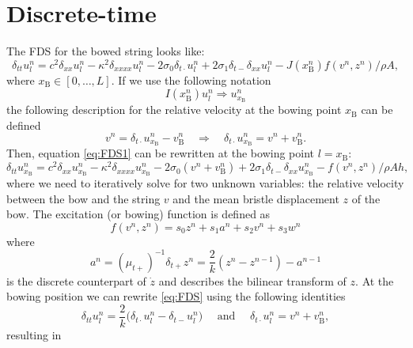 \documentclass{article}
\begin{document}
\section{Discrete-time}
The FDS for the bowed string looks like:
\begin{equation}\label{eq:FDS1}
    \delta_{tt} u_l^n =c^2 \delta_{xx} u_l^n -\kappa^2\delta_{xxxx} u_l^n - 2\sigma_0\delta_{t\cdot} u_l^n
    + 2\sigma_1\delta_{t-}\delta_{xx}u_l^n - J(x_\text{B}^n)f(v^n, z^n)/\rho A,
\end{equation}
where $x_\text{B} \in [0,\hdots, L]$. If we use the following notation
\begin{equation}
    I(x_\text{B}^n)u^n_l \Rightarrow u^n_{x_\text{B}}
\end{equation}
the following description for the relative velocity at the bowing point $x_\text{B}$ can be defined
\begin{equation}
    v^n = \delta_{t\cdot}u^n_{x_\text{B}} - v_\text{B}^n \quad \Rightarrow \quad \delta_{t\cdot}u^n_{x_\text{B}} = v^n + v_\text{B}^n.
\end{equation}
Then, equation \eqref{eq:FDS1} can be rewritten at the bowing point $l=x_\text{B}$:
\begin{equation}
\label{eq:FDS}
\delta_{tt} u_{x_\text{B}}^n =c^2 \delta_{xx} u_{x_\text{B}}^n -\kappa^2\delta_{xxxx} u_{x_\text{B}}^n - 2\sigma_0(v^n + v_\text{B}^n)
+ 2\sigma_1\delta_{t-}\delta_{xx}u_{x_\text{B}}^n - f(v^n, z^n)/\rho Ah,
\end{equation}
where we need to iteratively solve for two unknown variables: the relative velocity between the bow and the string $v$ and the mean bristle displacement $z$ of the bow.
The excitation (or bowing) function is defined as
\begin{equation}
    f(v^n, z^n) = s_0z^n + s_1 a^n + s_2v^n + s_3w^n
\end{equation}
where 
\begin{equation}\label{eq:an}
    a^n = (\mu_{t+})^{-1}\delta_{t+}z^n = \frac{2}{k}(z^n-z^{n-1})-a^{n-1}
\end{equation}
is the discrete counterpart of $\dot{z}$ and describes the bilinear transform of $z$. 
At the bowing position we can rewrite \eqref{eq:FDS} using the following identities
\begin{equation}
    \delta_{tt}u_l^n = \frac{2}{k}\big(\delta_{t\cdot}u_l^n-\delta_{t-}u_l^n\big) \quad \text{ and } \quad \delta_{t\cdot}u_l^n = v^n + v_\text{B}^n,
\end{equation}
resulting in 
\end{document}

